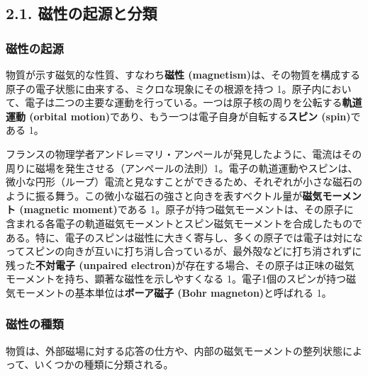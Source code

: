 \documentclass[11pt,a4paper]{ltjsarticle}
\begin{document}
\subsection*{2.1. 磁性の起源と分類}

\subsubsection*{磁性の起源}

物質が示す磁気的な性質、すなわち\textbf{磁性 (magnetism)}は、その物質を構成する原子の電子状態に由来する、ミクロな現象にその根源を持つ 1。原子内において、電子は二つの主要な運動を行っている。一つは原子核の周りを公転する\textbf{軌道運動 (orbital motion)}であり、もう一つは電子自身が自転する\textbf{スピン (spin)}である 1。

フランスの物理学者アンドレ＝マリ・アンペールが発見したように、電流はその周りに磁場を発生させる（アンペールの法則）1。電子の軌道運動やスピンは、微小な円形（ループ）電流と見なすことができるため、それぞれが小さな磁石のように振る舞う。この微小な磁石の強さと向きを表すベクトル量が\textbf{磁気モーメント (magnetic moment)}である 1。原子が持つ磁気モーメントは、その原子に含まれる各電子の軌道磁気モーメントとスピン磁気モーメントを合成したものである。特に、電子のスピンは磁性に大きく寄与し、多くの原子では電子は対になってスピンの向きが互いに打ち消し合っているが、最外殻などに打ち消されずに残った\textbf{不対電子 (unpaired electron)}が存在する場合、その原子は正味の磁気モーメントを持ち、顕著な磁性を示しやすくなる 1。電子1個のスピンが持つ磁気モーメントの基本単位は\textbf{ボーア磁子 (Bohr magneton)}と呼ばれる 1。

\subsubsection*{磁性の種類}

物質は、外部磁場に対する応答の仕方や、内部の磁気モーメントの整列状態によって、いくつかの種類に分類される。
\end{document}
